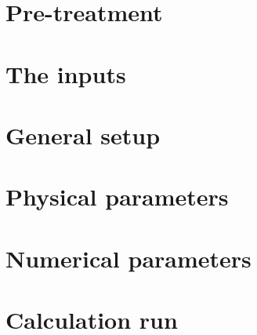 \documentclass[Courlis]{../../data/TelemacDoc} %
\begin{document}
\chapter{Pre-treatment}\label{chap2}

\newpage

\chapter{The inputs}\label{chap3}

\newpage

\chapter{General setup}\label{chap4}

\newpage

\chapter{Physical parameters}\label{chap5}

\newpage
\chapter{Numerical parameters}\label{chap6}

\newpage
\chapter{Calculation run}\label{chap7}

\newpage
\end{document}
